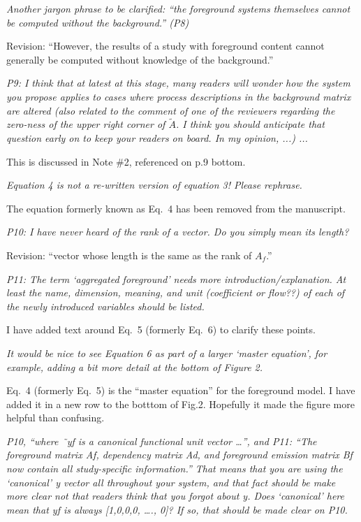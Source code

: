 \documentclass[11pt,letterpaper]{article}
\begin{document}
\emph{Another jargon phrase to be clarified:
  “the foreground systems themselves cannot be computed without the background.” (P8)}

Revision: ``However, the results of a study with foreground content cannot generally be computed without knowledge of the background.''

\emph{P9: I think that at latest at this stage, many readers will wonder how the system you propose applies to cases where process descriptions in the background matrix are altered (also related to the comment of one of the reviewers regarding the zero-ness of the upper right corner of $\tilde{A}$. I think you should anticipate that question early on to keep your readers on board. In my opinion, ...) ...}

This is discussed in Note \#2, referenced on p.9 bottom.

\emph{Equation 4 is not a re-written version of equation 3! Please rephrase.}

The equation formerly known as Eq.~4 has been removed from the manuscript.

\emph{P10: I have never heard of the rank of a vector. Do you simply mean its length?}

Revision: ``vector whose length is the same as the rank of $A_ f$.''

\emph{P11: The term ‘aggregated foreground’ needs more introduction/explanation. At least the name, dimension, meaning, and unit (coefficient or flow??) of each of the newly introduced variables should be listed.}

I have added text around Eq.~5 (formerly Eq.~6) to clarify these points.

\emph{It would be nice to see Equation 6 as part of a larger ‘master equation’, for example, adding a bit more detail at the bottom of Figure 2.}

Eq.~4 (formerly Eq.~5) is the ``master equation'' for the foreground model.  I have added it in a new row to the botttom of Fig.2.  Hopefully it made the figure more helpful than confusing.

\emph{P10, “where ˜yf is a canonical functional unit vector …”, and P11: “The foreground matrix Af, dependency matrix Ad, and foreground emission matrix Bf now contain all study-specific information.”
  That means that you are using the ‘canonical’ y vector all throughout your system, and that fact should be make more clear not that readers think that you forgot about y. Does ‘canonical’ here mean that yf is always [1,0,0,0, …., 0]? If so, that should be made clear on P10.}
\end{document}
